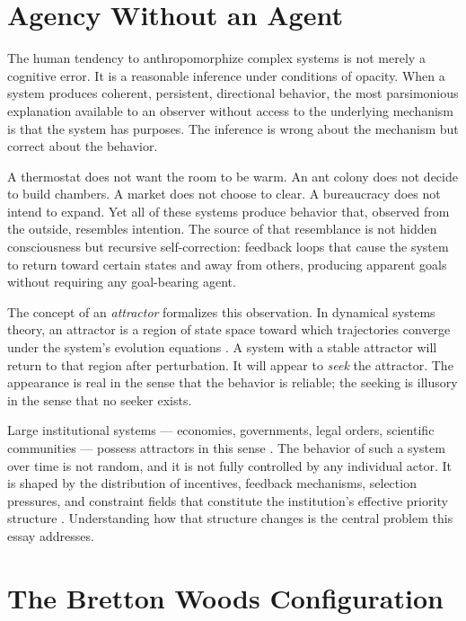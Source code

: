 \documentclass[12pt, a4paper]{article}
\theoremstyle{named}
\begin{document}
\section{Agency Without an Agent}

The human tendency to anthropomorphize complex systems is not merely a
cognitive error. It is a reasonable inference under conditions of
opacity. When a system produces coherent, persistent, directional
behavior, the most parsimonious explanation available to an observer
without access to the underlying mechanism is that the system has
purposes. The inference is wrong about the mechanism but correct about
the behavior.

A thermostat does not want the room to be warm. An ant colony does not
decide to build chambers. A market does not choose to clear. A
bureaucracy does not intend to expand. Yet all of these systems produce
behavior that, observed from the outside, resembles intention. The
source of that resemblance is not hidden consciousness but recursive
self-correction: feedback loops that cause the system to return toward
certain states and away from others, producing apparent goals without
requiring any goal-bearing agent.

The concept of an \emph{attractor} formalizes this observation. In
dynamical systems theory, an attractor is a region of state space toward
which trajectories converge under the system's evolution equations
\cite{strogatz2015,wiener1948,meadows2008}. A system with a stable attractor will
return to that region after perturbation. It will appear to \emph{seek}
the attractor. The appearance is real in the sense that the behavior is
reliable; the seeking is illusory in the sense that no seeker exists.

Large institutional systems — economies, governments, legal orders,
scientific communities — possess attractors in this sense
\cite{simon1962,holland1992,holland1995}. The behavior of such a system over time
is not random, and it is not fully controlled by any individual actor.
It is shaped by the distribution of incentives, feedback mechanisms,
selection pressures, and constraint fields that constitute the
institution's effective priority structure \cite{douglassnorth1990,
marcholsen1989}. Understanding how that structure changes is the central
problem this essay addresses.

\section{The Bretton Woods Configuration}
\end{document}
